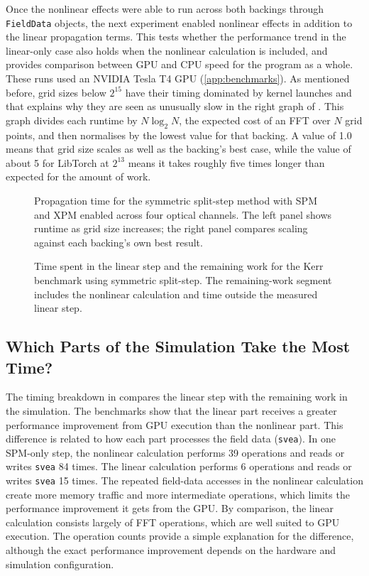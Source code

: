 Once the nonlinear effects were able to run across both backings through \texttt{FieldData} objects, 
the next experiment enabled nonlinear effects in addition to the linear propagation terms.
This tests whether the performance trend in the linear-only case also holds when the
nonlinear calculation is included, and provides comparison between GPU and CPU speed for the program
as a whole. These runs used an NVIDIA Tesla T4 GPU (\cref{app:benchmarks}). As mentioned before, grid sizes below $2^{15}$ have their timing dominated by kernel launches
and that explains why they are seen as unusually slow in the right graph of .
This graph divides each runtime by $N\log_2 N$, the expected cost of an FFT over $N$ grid points,
and then normalises by the lowest value for that backing. A value of 1.0 means that grid size
scales as well as the backing's best case, while the value of about 5 for LibTorch at $2^{13}$
means it takes roughly five times longer than expected for the amount of work.

\begin{figure}
  \centering
  \caption{Propagation time for the symmetric split-step method with SPM and XPM enabled
  across four optical channels. The left panel shows runtime as grid size increases; the right
  panel compares scaling against each backing's own best result.}
  \label{fig:four-channel-nonlinear-speed}
\end{figure}

\begin{figure}
  \centering
  \caption{Time spent in the linear step and the remaining work for the Kerr benchmark using
  symmetric split-step. The remaining-work segment includes the nonlinear calculation and
  time outside the measured linear step.}
  \label{fig:kerr-time-split}
\end{figure}

\subsection{Which Parts of the Simulation Take the Most Time?}

The timing breakdown in  compares the linear step with the
remaining work in the simulation. The benchmarks show that the linear part receives a
greater performance improvement from GPU execution than the nonlinear part. This difference
is related to how each part processes the field data (\texttt{svea}). In one SPM-only step,
the nonlinear calculation performs 39 operations and reads or writes \texttt{svea} 84
times. The linear calculation performs 6 operations and reads or writes \texttt{svea} 15
times. The repeated field-data accesses in the nonlinear calculation create more memory
traffic and more intermediate operations, which limits the performance improvement it gets
from the GPU. By comparison, the linear calculation consists largely of FFT operations,
which are well suited to GPU execution. The operation counts provide a simple explanation
for the difference, although the exact performance improvement depends on the hardware and
simulation configuration.

